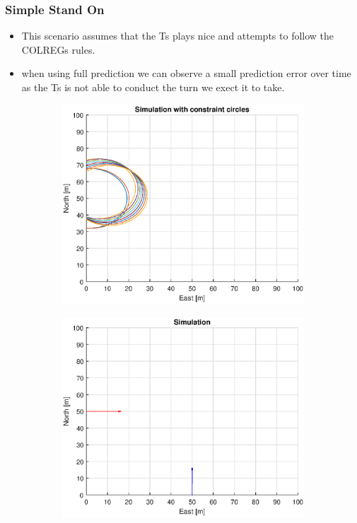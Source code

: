 \subsubsection{Simple Stand On}
\begin{itemize}
    \item This scenario assumes that the \gls{Ts} plays nice and attempts to follow the \gls{COLREGs} rules.
    \item when using full prediction we can observe a small prediction error over time as the \gls{Ts} is not able to
    conduct the turn we exect it to take.
\end{itemize}
\begin{figure}[!b] %
    \begin{subfigure}[b]{0.49\textwidth}
        \centering
        \includegraphics[width=\textwidth]{Images/Figures/Enkel_SO/Simple0_f1_Frame1}
    \end{subfigure}
    \hfill
    \begin{subfigure}[b]{0.499\textwidth}
        \centering
        \includegraphics[width=\textwidth]{Images/Figures/Enkel_SO/Simple0_f600_Frame1}

\end{subfigure}
\end{figure}
